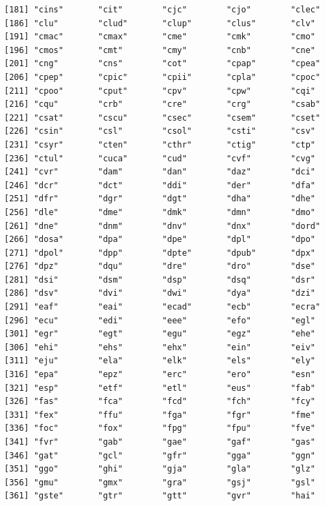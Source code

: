 \documentclass[
  letterpaper,
  DIV=11,
  numbers=noendperiod]{scrreprt}
\begin{document}
\begin{verbatim}
[181] "cins"       "cit"        "cjc"        "cjo"        "clec"      
[186] "clu"        "clud"       "clup"       "clus"       "clv"       
[191] "cmac"       "cmax"       "cme"        "cmk"        "cmo"       
[196] "cmos"       "cmt"        "cmy"        "cnb"        "cne"       
[201] "cng"        "cns"        "cot"        "cpap"       "cpea"      
[206] "cpep"       "cpic"       "cpii"       "cpla"       "cpoc"      
[211] "cpoo"       "cput"       "cpv"        "cpw"        "cqi"       
[216] "cqu"        "crb"        "cre"        "crg"        "csab"      
[221] "csat"       "cscu"       "csec"       "csem"       "cset"      
[226] "csin"       "csl"        "csol"       "csti"       "csv"       
[231] "csyr"       "cten"       "cthr"       "ctig"       "ctp"       
[236] "ctul"       "cuca"       "cud"        "cvf"        "cvg"       
[241] "cvr"        "dam"        "dan"        "daz"        "dci"       
[246] "dcr"        "dct"        "ddi"        "der"        "dfa"       
[251] "dfr"        "dgr"        "dgt"        "dha"        "dhe"       
[256] "dle"        "dme"        "dmk"        "dmn"        "dmo"       
[261] "dne"        "dnm"        "dnv"        "dnx"        "dord"      
[266] "dosa"       "dpa"        "dpe"        "dpl"        "dpo"       
[271] "dpol"       "dpp"        "dpte"       "dpub"       "dpx"       
[276] "dpz"        "dqu"        "dre"        "dro"        "dse"       
[281] "dsi"        "dsm"        "dsp"        "dsq"        "dsr"       
[286] "dsv"        "dvi"        "dwi"        "dya"        "dzi"       
[291] "eaf"        "eai"        "ecad"       "ecb"        "ecra"      
[296] "ecu"        "edi"        "eee"        "efo"        "egl"       
[301] "egr"        "egt"        "egu"        "egz"        "ehe"       
[306] "ehi"        "ehs"        "ehx"        "ein"        "eiv"       
[311] "eju"        "ela"        "elk"        "els"        "ely"       
[316] "epa"        "epz"        "erc"        "ero"        "esn"       
[321] "esp"        "etf"        "etl"        "eus"        "fab"       
[326] "fas"        "fca"        "fcd"        "fch"        "fcy"       
[331] "fex"        "ffu"        "fga"        "fgr"        "fme"       
[336] "foc"        "fox"        "fpg"        "fpu"        "fve"       
[341] "fvr"        "gab"        "gae"        "gaf"        "gas"       
[346] "gat"        "gcl"        "gfr"        "gga"        "ggn"       
[351] "ggo"        "ghi"        "gja"        "gla"        "glz"       
[356] "gmu"        "gmx"        "gra"        "gsj"        "gsl"       
[361] "gste"       "gtr"        "gtt"        "gvr"        "hai"       

\end{verbatim}
\end{document}
